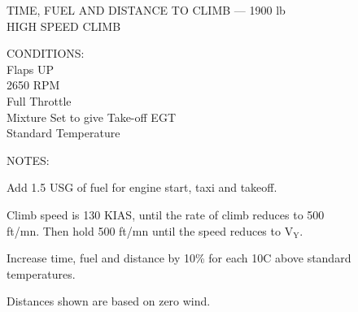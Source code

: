\begin{figure}[t]
\begin{center}
\begin{perfhdr}TIME, FUEL AND DISTANCE TO CLIMB --- 1900 lb\\
HIGH SPEED CLIMB\\
\end{perfhdr}
\Large

\normalsize
\vspace{5ex}
    \raggedright 
    CONDITIONS:\\
    Flaps UP\\
    2650 RPM\\
    Full Throttle\\
    Mixture Set to give Take-off EGT\\
    Standard Temperature\\
\hfill

\vspace{\perfnoteskip}
    \raggedright NOTES:
    \begin{enumerate*}
      \item Add 1.5 USG of fuel for engine start, taxi and takeoff.
      \item Climb speed is 130 KIAS, until the rate of climb reduces to 500 ft/mn.  Then hold 500 ft/mn until the speed reduces to $\mathrm{V_{Y}}$.
      \item Increase time, fuel and distance by 10\% for each 10\textdegree C above standard temperatures.
      \item Distances shown are based on zero wind.
      \end{enumerate*}
\vspace{\perfnoteskip}
\settowidth{\colOne}{WEIGHT}
\settowidth{\colTwo}{PRESSURE}
\settowidth{\colThree}{TEMP}
\settowidth{\colFour}{CLIMB}
\settowidth{\colFive}{RATE OF}
\settowidth{\colSix}{TIME}
\settowidth{\colSeven}{USED}
\settowidth{\colEight}{DIST.}


\end{center}
\end{figure}
